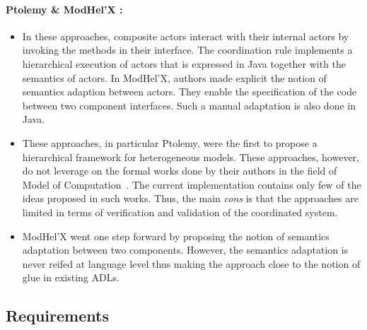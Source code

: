 \paragraph{Ptolemy \& ModHel'X :}	
\begin{itemize}
	\item In these approaches, composite actors interact with their internal actors by invoking the methods in their interface. The coordination rule implements a hierarchical execution of actors that is expressed in Java together with the semantics of actors. In ModHel'X, authors made explicit the notion of semantics adaption between actors. They enable the specification of the code between two component interfaces. Such a manual adaptation is also done in Java.
	
	\item These approaches, in particular Ptolemy, were the first to propose a hierarchical framework for heterogeneous models. These approaches, however, do not leverage on the formal works done by their authors in the field of Model of Computation~\cite{lee1998framework}. The current implementation contains only few of the ideas proposed in such works. Thus, the main \emph{cons} is that the approaches are limited in terms of verification and validation of the coordinated system. 
		
	\item ModHel'X went one step forward by proposing the notion of semantics adaptation between two components. However, the semantics adaptation is never reifed at language level thus making the approach close to the notion of glue in existing ADLs.
	
\end{itemize}		



\subsection{Requirements}

